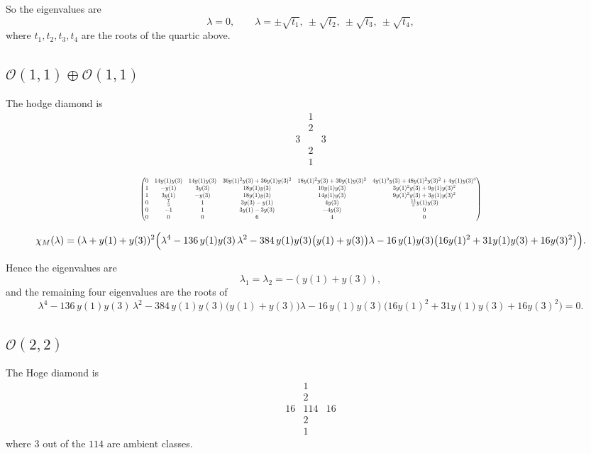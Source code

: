 \documentclass[11pt]{amsart}
\begin{document}
So the eigenvalues are
\[
\lambda=0,
\qquad
\lambda=\pm\sqrt{t_1},\ \pm\sqrt{t_2},\ \pm\sqrt{t_3},\ \pm\sqrt{t_4},
\]
where \(t_1,t_2,t_3,t_4\) are the roots of the quartic above.


\subsection{$\mathcal{O}(1,1) \oplus \mathcal{O}(1,1)$}
The hodge diamond is
\[
    \begin{array}{ccc}
         &1&  \\
         &2&\\
         3&&3\\
         &2&\\
         &1&
    \end{array}
\]

\[
  \resizebox{\textwidth}{!}{$
\begin{pmatrix}
0 & 14y(1)y(3) & 14y(1)y(3) & 36y(1)^2y(3)+36y(1)y(3)^2 & 18y(1)^2y(3)+30y(1)y(3)^2 & 4y(1)^3y(3)+48y(1)^2y(3)^2+4y(1)y(3)^3 \\
1 & -y(1) & 3y(3) & 18y(1)y(3) & 10y(1)y(3) & 3y(1)^2y(3)+9y(1)y(3)^2 \\
1 & 3y(1) & -y(3) & 18y(1)y(3) & 14y(1)y(3) & 9y(1)^2y(3)+3y(1)y(3)^2 \\
0 & \tfrac{7}{3} & 1 & 3y(3)-y(1) & 4y(3) & \tfrac{14}{3}y(1)y(3) \\
0 & -1 & 1 & 3y(1)-3y(3) & -4y(3) & 0 \\
0 & 0 & 0 & 6 & 4 & 0
\end{pmatrix}
$}
\]


\[
\chi_M(\lambda)
=
(\lambda+y(1)+y(3))^2
\Bigl(
\lambda^4
-136\,y(1)y(3)\,\lambda^2
-384\,y(1)y(3)\bigl(y(1)+y(3)\bigr)\lambda
-16\,y(1)y(3)\bigl(16y(1)^2+31y(1)y(3)+16y(3)^2\bigr)
\Bigr).
\]

Hence the eigenvalues are
\[
\lambda_1=\lambda_2=-(y(1)+y(3)),
\]
and the remaining four eigenvalues are the roots of
\[
\lambda^4
-136\,y(1)y(3)\,\lambda^2
-384\,y(1)y(3)\bigl(y(1)+y(3)\bigr)\lambda
-16\,y(1)y(3)\bigl(16y(1)^2+31y(1)y(3)+16y(3)^2\bigr)=0.
\]
\subsection{$\mathcal{O}(2,2)$}

The Hoge diamond is
\[
\begin{array}{ccc}
     &1&  \\
     &2&\\
     16&114&16\\
     &2&\\
     &1&
\end{array}
\]
where $3$ out of the $114$ are ambient classes.
\end{document}
